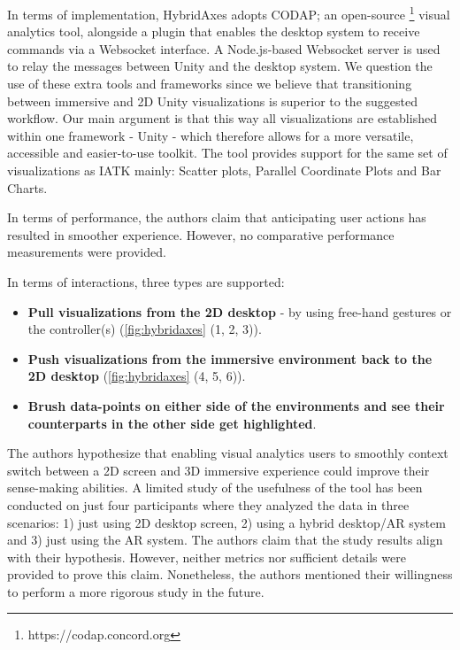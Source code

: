 \documentclass{vgtc}                          %
\begin{document}
\medskip

\noindent In terms of implementation, HybridAxes adopts CODAP; an open-source
\footnote{https://codap.concord.org} visual analytics tool, alongside a plugin
that enables the desktop system to receive commands via a Websocket interface.
A Node.js-based Websocket server is used to relay the messages between Unity
and the desktop system. We question the use of these extra tools and frameworks
since we believe that transitioning between immersive and 2D Unity
visualizations is superior to the suggested workflow. Our main argument is
that this way all visualizations are established within one framework - Unity -
which therefore allows for a more versatile, accessible and easier-to-use
toolkit. The tool provides support for the same set of visualizations as IATK
mainly: Scatter plots, Parallel Coordinate Plots and Bar Charts.

\medskip

\noindent In terms of performance, the authors claim that anticipating user actions has resulted in smoother
experience. However, no comparative performance measurements were provided.

\smallskip

\noindent In terms of interactions, three types are supported:
\begin{itemize}
	\item \textbf{Pull visualizations from the 2D desktop} - by using free-hand gestures
	      or the controller(s) (\autoref{fig:hybridaxes} (1, 2, 3)).
	\item \textbf{Push visualizations from the immersive environment back to the 2D
		      desktop} (\autoref{fig:hybridaxes} (4, 5, 6)).
	\item \textbf{Brush data-points on either side of the environments and see their
		      counterparts in the other side get highlighted}.
\end{itemize}


\noindent The authors hypothesize that enabling visual analytics users to
smoothly context switch between a 2D screen and 3D immersive experience could
improve their sense-making abilities. A limited study of the usefulness of the
tool has been conducted on just four participants where they analyzed the data
in three scenarios: 1) just using 2D desktop screen, 2) using a hybrid
desktop/AR system and 3) just using the AR system. The authors claim that the
study results align with their hypothesis. However, neither metrics nor
sufficient details were provided to prove this claim. Nonetheless, the authors
mentioned their willingness to perform a more rigorous study in the future.
\end{document}
